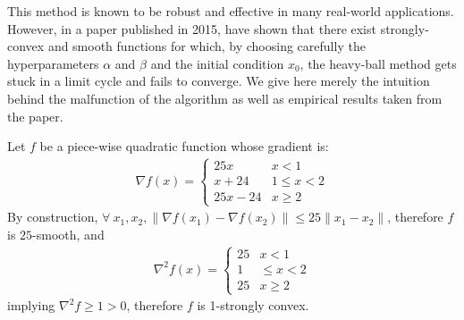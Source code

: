 \documentclass{article}
\begin{document}
This method is known to be robust and effective in many real-world applications. However, in a paper published in 2015, \citet{2014arXiv1408.3595L} have shown that there exist strongly-convex and smooth functions for which, by choosing carefully the hyperparameters $\alpha$ and $\beta$ and the initial condition $x_0$, the heavy-ball method gets stuck in a limit cycle and fails to converge. We give here merely the intuition behind the malfunction of the algorithm as well as empirical results taken from the paper.

\vspace{2ex}

Let $f$ be a piece-wise quadratic function whose gradient is:
\begin{gather}
	\nabla f(x) =  \begin{cases}
    25x &   x < 1 \\
    x+24   &  1 \leq x < 2 \\
    25x-24 & x \geq 2
\end{cases}
\end{gather}
By construction,  $\forall \ x_1, x_2, \|\nabla f(x_1)-\nabla f(x_2)\| \leq 25\|x_1 - x_2\|$, therefore $f$ is $25$-smooth, and 
\begin{gather}
\nabla^2 f(x) =
\begin{cases}
    25 &  x < 1 \\
    1   &  \leq x < 2 \\
    25 & x\geq 2
\end{cases}
\end{gather}
implying $\nabla^2 f \geq 1>0$, therefore $f$ is 1-strongly convex.\\
\end{document}
